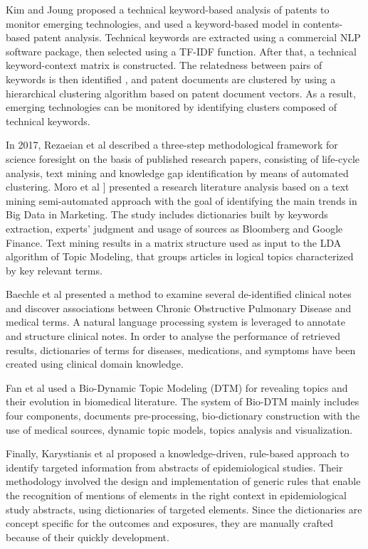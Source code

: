 \documentclass[b5paper,]{book}
\theoremstyle{definition}
\theoremstyle{definition}
\theoremstyle{definition}
\theoremstyle{remark}
\begin{document}
Kim and Joung \citep{joung2017monitoring} proposed a technical
keyword-based analysis of patents to monitor emerging technologies, and
used a keyword-based model in contents-based patent analysis. Technical
keywords are extracted using a commercial NLP software package, then
selected using a TF-IDF function. After that, a technical
keyword-context matrix is constructed. The relatedness between pairs of
keywords is then identified , and patent documents are clustered by
using a hierarchical clustering algorithm based on patent document
vectors. As a result, emerging technologies can be monitored by
identifying clusters composed of technical keywords.

In 2017, Rezaeian et al \citep{rezaeian2017science} described a
three-step methodological framework for science foresight on the basis
of published research papers, consisting of life-cycle analysis, text
mining and knowledge gap identification by means of automated
clustering. Moro et al \citet{amado2018research}{]} presented a research
literature analysis based on a text mining semi-automated approach with
the goal of identifying the main trends in Big Data in Marketing. The
study includes dictionaries built by keywords extraction, experts'
judgment and usage of sources as Bloomberg and Google Finance. Text
mining results in a matrix structure used as input to the LDA algorithm
of Topic Modeling, that groups articles in logical topics characterized
by key relevant terms.

Baechle et al \citep{baechle2017big} presented a method to examine
several de-identified clinical notes and discover associations between
Chronic Obstructive Pulmonary Disease and medical terms. A natural
language processing system is leveraged to annotate and structure
clinical notes. In order to analyse the performance of retrieved
results, dictionaries of terms for diseases, medications, and symptoms
have been created using clinical domain knowledge.

Fan et al \citep{chen2017revealing} used a Bio-Dynamic Topic Modeling
(DTM) for revealing topics and their evolution in biomedical literature.
The system of Bio-DTM mainly includes four components, documents
pre-processing, bio-dictionary construction with the use of medical
sources, dynamic topic models, topics analysis and visualization.

Finally, Karystianis et al \citep{karystianis2017evaluation} proposed a
knowledge-driven, rule-based approach to identify targeted information
from abstracts of epidemiological studies. Their methodology involved
the design and implementation of generic rules that enable the
recognition of mentions of elements in the right context in
epidemiological study abstracts, using dictionaries of targeted
elements. Since the dictionaries are concept specific for the outcomes
and exposures, they are manually crafted because of their quickly
development.
\end{document}
